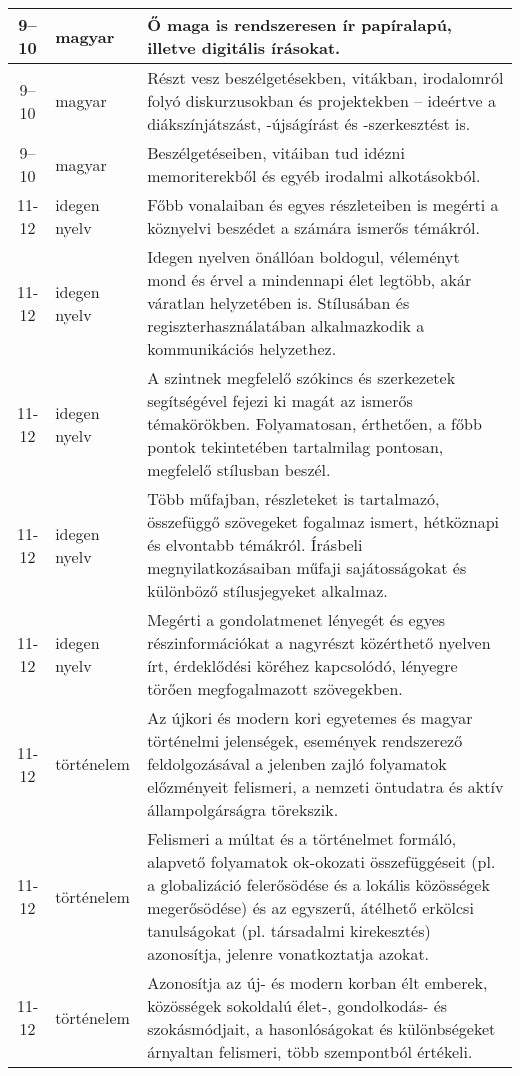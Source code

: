 \begin{small}
\begin{longtable}{c | p{2cm} |  p{11cm} }
              9--10 & magyar & Ő maga is rendszeresen ír papíralapú, illetve digitális írásokat. \\ \hline
              9--10 & magyar & Részt vesz beszélgetésekben, vitákban, irodalomról folyó diskurzusokban és projektekben – ideértve a diákszínjátszást, -újságírást és -szerkesztést is. \\ \hline
              9--10 & magyar & Beszélgetéseiben, vitáiban tud idézni memoriterekből és egyéb irodalmi alkotásokból. \\ \hline
              11-12 & idegen nyelv & Főbb vonalaiban és egyes részleteiben is megérti a köznyelvi beszédet a számára ismerős témákról. \\ \hline
              11-12 & idegen nyelv & Idegen nyelven önállóan boldogul, véleményt mond és érvel a mindennapi élet legtöbb, akár váratlan helyzetében is. Stílusában és regiszterhasználatában alkalmazkodik a kommunikációs helyzethez. \\ \hline
              11-12 & idegen nyelv & A szintnek megfelelő szókincs és szerkezetek segítségével fejezi ki magát az ismerős témakörökben. Folyamatosan, érthetően, a főbb pontok tekintetében tartalmilag pontosan, megfelelő stílusban beszél. \\ \hline
              11-12 & idegen nyelv & Több műfajban, részleteket is tartalmazó, összefüggő szövegeket fogalmaz ismert, hétköznapi és elvontabb témákról. Írásbeli megnyilatkozásaiban műfaji sajátosságokat és különböző stílusjegyeket alkalmaz. \\ \hline
              11-12 & idegen nyelv & Megérti a gondolatmenet lényegét és egyes részinformációkat a nagyrészt közérthető nyelven írt, érdeklődési köréhez kapcsolódó, lényegre törően megfogalmazott szövegekben. \\ \hline
              11-12 & történelem & Az újkori és modern kori egyetemes és magyar történelmi jelenségek, események rendszerező feldolgozásával a jelenben zajló folyamatok előzményeit felismeri, a nemzeti öntudatra és aktív állampolgárságra törekszik. \\ \hline
              11-12 & történelem & Felismeri a múltat és a történelmet formáló, alapvető folyamatok ok-okozati összefüggéseit (pl. a globalizáció felerősödése és a lokális közösségek megerősödése) és az egyszerű, átélhető erkölcsi tanulságokat (pl. társadalmi kirekesztés) azonosítja, jelenre vonatkoztatja azokat. \\ \hline
              11-12 & történelem & Azonosítja az új- és modern korban élt emberek, közösségek sokoldalú élet-, gondolkodás- és szokásmódjait, a hasonlóságokat és különbségeket árnyaltan felismeri, több szempontból értékeli. \\ \hline

\end{longtable}
\end{small}
